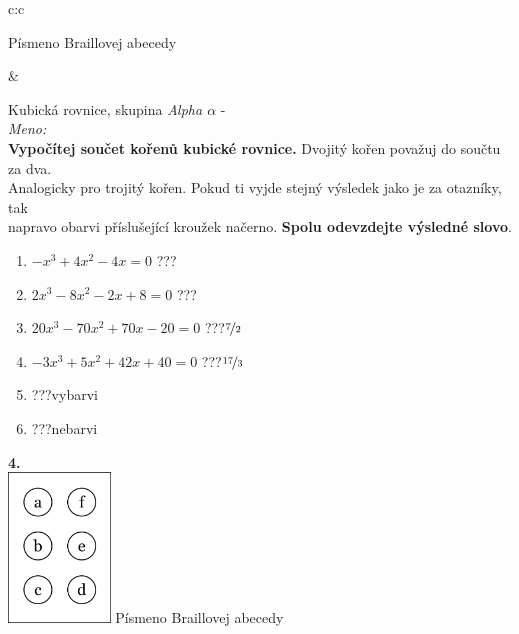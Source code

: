\documentclass[10pt]{report}
\begin{document}
\begin{tabular}{c:c}
\begin{minipage}[c][99mm][t]{0.49\linewidth}
\begin{center}
\begin{minipage}{0.20\linewidth}
\begin{center}
{\small Písmeno Braillovej abecedy}
\end{center}
\end{minipage}
\end{center}
\end{minipage}
&
\begin{minipage}[c][99mm][t]{0.49\linewidth}
\begin{center}
\vspace{7mm}
{\huge Kubická rovnice, skupina \textit{Alpha $\alpha$} -}\\[4.5mm]
\textit{Meno:}\phantom{xxxxxxxxxxxxxxxxxxxxxxxxxxxxxxxxxxxxxxxxxxxxxxxxxxxxxxxxxxxxxxxxx}\\[3.5mm]
\textbf{Vypočítej součet kořenů kubické rovnice.} Dvojitý kořen považuj do součtu za dva.\\Analogicky pro trojitý kořen. Pokud ti vyjde stejný výsledek jako je za otazníky, tak\\napravo obarvi příslušející kroužek načerno. \textbf{Spolu odevzdejte výsledné slovo}.\\[3mm]
\begin{minipage}{0.77\linewidth}
\begin{center}
\begin{varwidth}{\textwidth}
\begin{enumerate}
\large
\item $-x^3+4x^2-4x=0$\quad \dotfill\; ???\;\dotfill {}
\item $2x^3-8x^2-2x+8=0$\quad \dotfill\; ???\;\dotfill {}
\item $20x^3-70x^2+70x-20=0$\quad \dotfill\; ???\;\dotfill \quad $\nicefrac{7}{2}$
\item $-3x^3+5x^2+42x+40=0$\quad \dotfill\; ???\;\dotfill \quad $\nicefrac{17}{3}$
\item \quad \dotfill\; ???\;\dotfill \quad vybarvi
\item \quad \dotfill\; ???\;\dotfill \quad nebarvi
\end{enumerate}
\end{varwidth}
\end{center}
\end{minipage}
\begin{minipage}{0.20\linewidth}
\begin{center}
{\Huge\bfseries 4.} \\[2mm]
\includegraphics[height=40mm]{../images/braille.png}
{\small Písmeno Braillovej abecedy}
\end{center}
\end{minipage}
\end{center}
\end{minipage}

\end{tabular}
\end{document}
